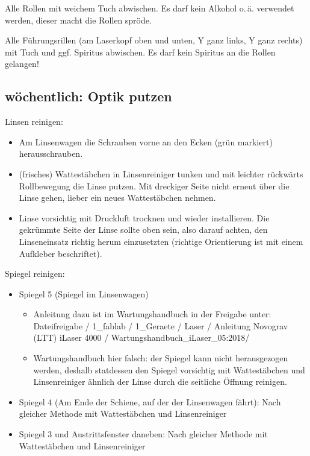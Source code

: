 \documentclass{\basedir/fablab-document}
\begin{document}
	Alle Rollen mit weichem Tuch abwischen. Es darf kein Alkohol o.\,ä. verwendet werden, dieser macht die Rollen spröde.

	Alle Führungsrillen (am Laserkopf oben und unten, Y ganz links, Y ganz rechts) mit Tuch und ggf. Spiritus abwischen. Es darf kein Spiritus an die Rollen gelangen!

	\subsection{wöchentlich: Optik putzen}

	Linsen reinigen:
	\begin{itemize}
		\item Am Linsenwagen die Schrauben vorne an den Ecken (grün markiert) herausschrauben.
		\item (frisches) Wattestäbchen in Linsenreiniger tunken und mit leichter rückwärts Rollbewegung die Linse putzen. Mit dreckiger Seite nicht erneut über die Linse gehen, lieber ein neues Wattestäbchen nehmen.
		\item Linse vorsichtig mit Druckluft trocknen und wieder installieren. Die gekrümmte Seite der Linse sollte oben sein, also darauf achten, den Linseneinsatz richtig herum einzusetzten (richtige Orientierung ist mit einem Aufkleber beschriftet).
	\end{itemize}

	Spiegel reinigen:
	\begin{itemize}
		\item Spiegel 5 (Spiegel im Linsenwagen)
		\begin{itemize}
			\item 	Anleitung dazu ist im Wartungshandbuch in der Freigabe unter: Dateifreigabe / 1\_fablab / 1\_Geraete / Laser / Anleitung Novograv (LTT) iLaser 4000 / Wartungshandbuch\_iLaser\_05:2018/
			\item 	Wartungshandbuch hier falsch: der Spiegel kann nicht herausgezogen werden, deshalb statdessen den Spiegel vorsichtig mit Wattestäbchen und Linsenreiniger ähnlich der Linse durch die seitliche Öffnung reinigen.
		\end{itemize}
		\item Spiegel 4 (Am Ende der Schiene, auf der der Linsenwagen fährt): Nach gleicher Methode mit Wattestäbchen und Linsenreiniger
		\item Spiegel 3 und Austrittsfenster daneben: Nach gleicher Methode mit Wattestäbchen und Linsenreiniger
	\end{itemize}
\end{document}
